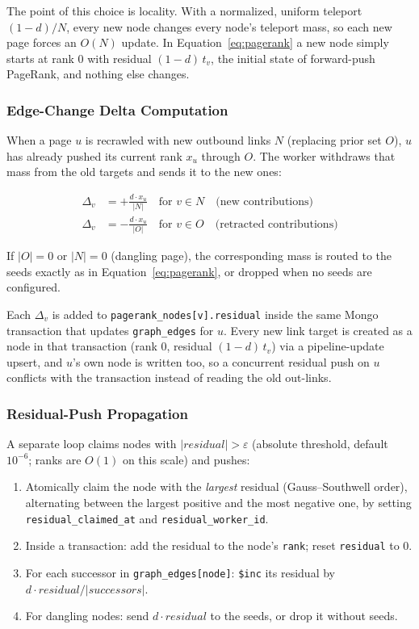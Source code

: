\documentclass[11pt,a4paper]{article}
\newcommand{\code}[1]{\texttt{#1}}
\begin{document}
The point of this choice is locality. With a normalized, uniform teleport $(1-d)/N$, every new node changes every node's teleport mass, so each new page forces an $O(N)$ update. In Equation~\ref{eq:pagerank} a new node simply starts at rank 0 with residual $(1-d)\,t_v$, the initial state of forward-push PageRank, and nothing else changes.

\subsubsection{Edge-Change Delta Computation}

When a page \(u\) is recrawled with new outbound links \(N\) (replacing prior set \(O\)), \(u\) has already pushed its current rank \(x_u\) through \(O\). The worker withdraws that mass from the old targets and sends it to the new ones:

\begin{align}
\Delta_v &= +\frac{d \cdot x_u}{|N|} \quad \text{for } v \in N \quad \text{(new contributions)}\\
\Delta_v &= -\frac{d \cdot x_u}{|O|} \quad \text{for } v \in O \quad \text{(retracted contributions)}
\end{align}

If \(|O| = 0\) or \(|N| = 0\) (dangling page), the corresponding mass is routed to the seeds exactly as in Equation~\ref{eq:pagerank}, or dropped when no seeds are configured.

Each $\Delta_v$ is added to \code{pagerank\_nodes[v].residual} inside the same Mongo transaction that updates \code{graph\_edges} for $u$. Every new link target is created as a node in that transaction (rank 0, residual $(1-d)\,t_v$) via a pipeline-update upsert, and $u$'s own node is written too, so a concurrent residual push on $u$ conflicts with the transaction instead of reading the old out-links.

\subsubsection{Residual-Push Propagation}

A separate loop claims nodes with \(|residual| > \varepsilon\) (absolute threshold, default $10^{-6}$; ranks are $O(1)$ on this scale) and pushes:

\begin{enumerate}
  \item Atomically claim the node with the \emph{largest} residual (Gauss--Southwell order), alternating between the largest positive and the most negative one, by setting \code{residual\_claimed\_at} and \code{residual\_worker\_id}.
  \item Inside a transaction: add the residual to the node's \code{rank}; reset \code{residual} to 0.
  \item For each successor in \code{graph\_edges[node]}: \code{\$inc} its residual by $d \cdot \textit{residual} / |\textit{successors}|$.
  \item For dangling nodes: send $d \cdot \textit{residual}$ to the seeds, or drop it without seeds.
\end{enumerate}
\end{document}
